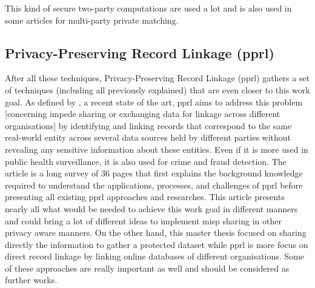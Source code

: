 \documentclass{eplmastersthesis}
\begin{document}
This kind of secure two-party computations are used a lot and is also used in some articles for multi-party private matching. \\

\subsection{Privacy-Preserving Record Linkage (\gls{pprl})}
After all these techniques, Privacy-Preserving Record Linkage (\gls{pprl}) gathers a set of techniques (including all previously explained) that are even closer to this work goal. As defined by \cite{vatsalanprivacy}, a recent state of the art, \gls{pprl} aims to address this problem [concerning impede sharing or exchanging data for linkage across different organisations] by identifying and linking records that correspond to the same real-world entity across several data sources held by different parties without revealing any sensitive information about these entities.
Even if it is more used in public health surveillance, it is also used for crime and fraud detection.
The article is a long survey of 36 pages that first explains the background knowledge required to understand the applications, processes, and challenges of \gls{pprl} before presenting all existing \gls{pprl} approaches and researches.
This article presents nearly all what would be needed to achieve this work goal in different manners and could bring a lot of different ideas to implement \gls{misp} sharing in other privacy aware manners.
On the other hand, this master thesis focused on sharing directly the information to gather a protected dataset while \gls{pprl} is more focus on direct record linkage by linking online databases of different organisations. Some of these approaches are really important as well and should be considered as further works.
\end{document}
